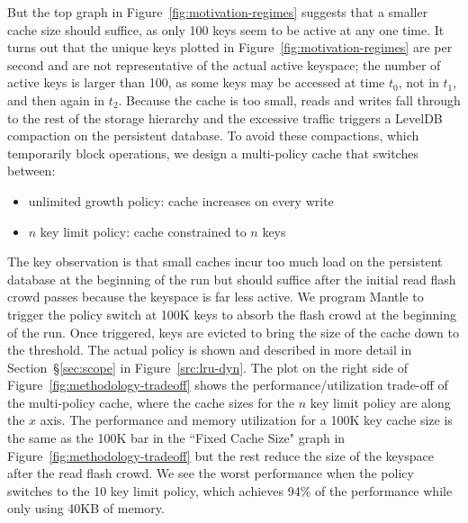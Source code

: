 %
%

But the top graph in Figure~\ref{fig:motivation-regimes} suggests that a
smaller cache size should suffice, as only 100 keys seem to be active at any
one time.  It turns out that the unique keys plotted in
Figure~\ref{fig:motivation-regimes} are per second and are not representative
of the actual active keyspace; the number of active keys is larger than 100, as
some keys may be accessed at time \(t_0\), not in \(t_1\), and then again in
\(t_2\). Because the cache is too small, reads and writes fall through to the
rest of the storage hierarchy and the excessive traffic triggers a LevelDB
compaction on the persistent database.  To avoid these compactions, which
temporarily block operations, we design a multi-policy cache that switches
between:

\begin{itemize}
  \item unlimited growth policy: cache increases on every write
  \item \(n\) key limit policy: cache constrained to \(n\) keys
\end{itemize}

The key observation is that small caches incur too much load on the persistent
database at the beginning of the run but should suffice after the initial read
flash crowd passes because the keyspace is far less active.  We program Mantle
to trigger the policy switch at 100K keys to absorb the flash crowd at the
beginning of the run. Once triggered, keys are evicted to bring the size of the
cache down to the threshold.  The actual policy is shown and described in more
detail in Section~\S\ref{sec:scope} in Figure~\ref{src:lru-dyn}.  The plot on
the right side of Figure~\ref{fig:methodology-tradeoff} shows the
performance/utilization trade-off of the multi-policy cache, where the cache
sizes for the \(n\) key limit policy are along the \(x\) axis.  The performance
and memory utilization for a 100K key cache size is the same as the 100K bar in
the ``Fixed Cache Size" graph in Figure~\ref{fig:methodology-tradeoff} but the
rest reduce the size of the keyspace after the read flash crowd.  We see the
worst performance when the policy switches to the 10 key limit policy, which
achieves 94\% of the performance while only using 40KB of memory. 

